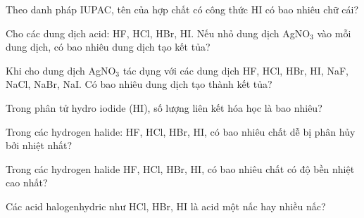 \documentclass[Main.tex]{subfiles}
\begin{document}
    \begin{bt}
    Theo danh pháp IUPAC, tên của hợp chất có công thức HI có bao nhiêu chữ cái?
    \end{bt}
    
    \begin{bt}
    Cho các dung dịch acid: HF, HCl, HBr, HI. Nếu nhỏ dung dịch AgNO$_3$ vào mỗi dung dịch, có bao nhiêu dung dịch tạo kết tủa?
    \end{bt}
    
    \begin{bt}
    Khi cho dung dịch AgNO$_3$ tác dụng với các dung dịch HF, HCl, HBr, HI, NaF, NaCl, NaBr, NaI. Có bao nhiêu dung dịch tạo thành kết tủa?
    \end{bt}
    
    
    \begin{bt}
    Trong phân tử hydro iodide (HI), số lượng liên kết hóa học là bao nhiêu?
    \end{bt}
    
    \begin{bt}
    Trong các hydrogen halide: HF, HCl, HBr, HI, có bao nhiêu chất dễ bị phân hủy bởi nhiệt nhất?
    \end{bt}
    
    \begin{bt}
    Trong các hydrogen halide HF, HCl, HBr, HI, có bao nhiêu chất có độ bền nhiệt cao nhất?
    \end{bt}
    
    \begin{bt}
    Các acid halogenhydric như HCl, HBr, HI là acid một nấc hay nhiều nấc?
    \end{bt}
    
\end{document}

